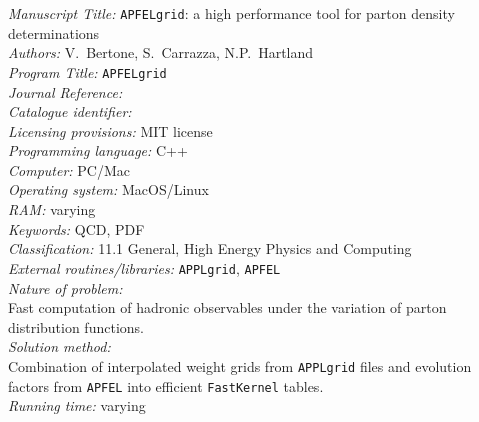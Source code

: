 \documentclass[preprint,12pt]{elsarticle}
\newcounter{bla}
\begin{document}
\begin{small}
\noindent
{\em Manuscript Title:} {\tt APFELgrid}: a high performance tool for parton density determinations                                      \\
{\em Authors:} V.~Bertone, S.~Carrazza, N.P.~Hartland                                               \\
{\em Program Title:} {\tt APFELgrid}                                          \\
{\em Journal Reference:}                                      \\
{\em Catalogue identifier:}                                   \\
{\em Licensing provisions:}   MIT license                                \\
{\em Programming language:}  C++                                 \\
{\em Computer:} PC/Mac                                               \\
{\em Operating system:} MacOS/Linux                                       \\
{\em RAM:} varying                                              \\
{\em Keywords:} QCD, PDF\\
{\em Classification:}  11.1 General, High Energy Physics and Computing                                       \\
{\em External routines/libraries:}  {\tt APPLgrid}, {\tt APFEL}                          \\
{\em Nature of problem:}\\
 Fast computation of hadronic observables under the variation of parton distribution functions.
   \\
{\em Solution method:}\\
  Combination of interpolated weight grids from {\tt APPLgrid} files and evolution factors from {\tt APFEL} into efficient {\tt FastKernel} tables.\\
{\em Running time:} varying\\
   \\
\end{small}
\end{document}

